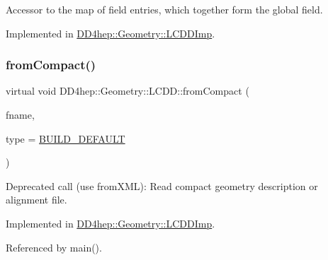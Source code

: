 Accessor to the map of field entries, which together form the global field. 



Implemented in \hyperlink{class_d_d4hep_1_1_geometry_1_1_l_c_d_d_imp_af78d60748f098a61296c3d2db3a94a32}{D\+D4hep\+::\+Geometry\+::\+L\+C\+D\+D\+Imp}.

\hypertarget{class_d_d4hep_1_1_geometry_1_1_l_c_d_d_abc18ac1b03188da6e4400943eca4bd2e}{}\label{class_d_d4hep_1_1_geometry_1_1_l_c_d_d_abc18ac1b03188da6e4400943eca4bd2e} 
\subsubsection{\texorpdfstring{from\+Compact()}{fromCompact()}}
{\footnotesize\ttfamily virtual void D\+D4hep\+::\+Geometry\+::\+L\+C\+D\+D\+::from\+Compact (\begin{DoxyParamCaption}\item[{const std\+::string \&}]{fname,  }\item[{\hyperlink{namespace_d_d4hep_acafe43ba4537ab6e999e808142965fab}{L\+C\+D\+D\+Build\+Type}}]{type = {\ttfamily \hyperlink{namespace_d_d4hep_acafe43ba4537ab6e999e808142965fabaceac720f961afd2369fcc9f343113a2e}{B\+U\+I\+L\+D\+\_\+\+D\+E\+F\+A\+U\+LT}} }\end{DoxyParamCaption})\hspace{0.3cm}{\ttfamily [pure virtual]}}



Deprecated call (use from\+X\+ML)\+: Read compact geometry description or alignment file. 



Implemented in \hyperlink{class_d_d4hep_1_1_geometry_1_1_l_c_d_d_imp_a4eb2edfae225abead99a6cd6a85e84f7}{D\+D4hep\+::\+Geometry\+::\+L\+C\+D\+D\+Imp}.



Referenced by main().

\hypertarget{class_d_d4hep_1_1_geometry_1_1_l_c_d_d_ad6e8de7ab4f0374cea7e3e15e33af66e}{}\label{class_d_d4hep_1_1_geometry_1_1_l_c_d_d_ad6e8de7ab4f0374cea7e3e15e33af66e} 
